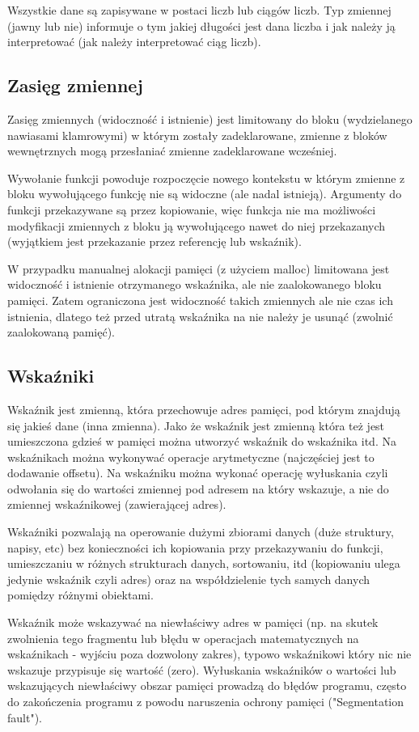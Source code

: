 Wszystkie dane są zapisywane w postaci liczb lub ciągów liczb. Typ zmiennej (jawny lub nie) informuje o tym jakiej długości jest dana liczba i jak należy ją interpretować (jak należy interpretować ciąg liczb). 

\subsection{Zasięg zmiennej}
Zasięg zmiennych (widoczność i istnienie) jest limitowany do bloku (wydzielanego nawiasami klamrowymi) w którym zostały zadeklarowane, zmienne z bloków wewnętrznych mogą przesłaniać zmienne zadeklarowane wcześniej.

Wywołanie funkcji powoduje rozpoczęcie nowego kontekstu w którym zmienne z bloku wywołującego funkcję nie są widoczne (ale nadal istnieją). Argumenty do funkcji przekazywane są przez kopiowanie, więc funkcja nie ma możliwości modyfikacji zmiennych z bloku ją wywołującego nawet do niej przekazanych (wyjątkiem jest przekazanie przez referencję lub wskaźnik).

W przypadku manualnej alokacji pamięci (z użyciem malloc) limitowana jest widoczność i istnienie otrzymanego wskaźnika, ale nie zaalokowanego bloku pamięci. Zatem ograniczona jest widoczność takich zmiennych ale nie czas ich istnienia, dlatego też przed utratą wskaźnika na nie należy je usunąć (zwolnić zaalokowaną pamięć). 

\subsection{Wskaźniki}
Wskaźnik jest zmienną, która przechowuje adres pamięci, pod którym znajdują się jakieś dane (inna zmienna). Jako że wskaźnik jest zmienną która też jest umieszczona gdzieś w pamięci można utworzyć wskaźnik do wskaźnika itd. Na wskaźnikach można wykonywać operacje arytmetyczne (najczęściej jest to dodawanie offsetu). Na wskaźniku można wykonać operację wyłuskania czyli odwołania się do wartości zmiennej pod adresem na który wskazuje, a nie do zmiennej wskaźnikowej (zawierającej adres).

Wskaźniki pozwalają na operowanie dużymi zbiorami danych (duże struktury, napisy, etc) bez konieczności ich kopiowania przy przekazywaniu do funkcji, umieszczaniu w różnych strukturach danych, sortowaniu, itd (kopiowaniu ulega jedynie wskaźnik czyli adres) oraz na współdzielenie tych samych danych pomiędzy różnymi obiektami.

Wskaźnik może wskazywać na niewłaściwy adres w pamięci (np. na skutek zwolnienia tego fragmentu lub błędu w operacjach matematycznych na wskaźnikach - wyjściu poza dozwolony zakres), typowo wskaźnikowi który nic nie wskazuje przypisuje się wartość  (zero). Wyłuskania wskaźników o wartości  lub wskazujących niewłaściwy obszar pamięci prowadzą do błędów programu, często do zakończenia programu z powodu naruszenia ochrony pamięci ("Segmentation fault"). 

